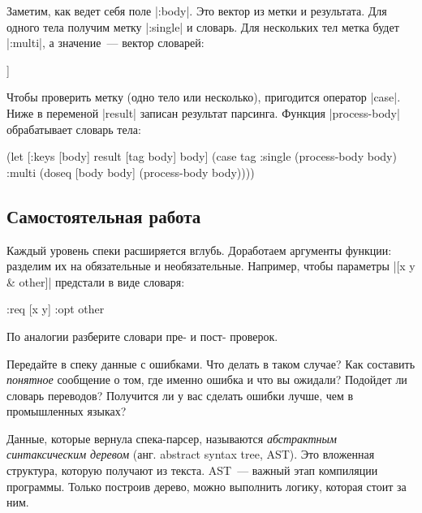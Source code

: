 Заметим, как ведет себя поле \spverb|:body|. Это вектор из метки и
результата. Для одного тела получим метку \spverb|:single| и словарь. Для
нескольких тел метка будет \spverb|:multi|, а значение~--- вектор словарей:

\begin{english}
  \begin{clojure}
[:multi [{:args [x] :code [(println 1)]}
         {:args [x y] :code [(println 2)]}]]
  \end{clojure}
\end{english}

Чтобы проверить метку (одно тело или несколько), пригодится оператор
\spverb|case|. Ниже в переменой \spverb|result| записан результат
парсинга. Функция \spverb|process-body| обрабатывает словарь тела:

\begin{english}
  \begin{clojure}
(let [{:keys [body]} result
      [tag body] body]
  (case tag
    :single
    (process-body body)
    :multi
    (doseq [body body]
      (process-body body))))
  \end{clojure}
\end{english}

\subsection{Самостоятельная работа}

Каждый уровень спеки расширяется вглубь. Доработаем аргументы функции: разделим
их на обязательные и необязательные. Например, чтобы параметры \spverb|[x y & other]|
предстали в виде словаря:

\begin{english}
  \begin{clojure}
{:req [x y] :opt other}
  \end{clojure}
\end{english}

\noindent
По аналогии разберите словари пре- и пост- проверок.

Передайте в спеку данные с ошибками. Что делать в таком случае? Как составить
\emph{понятное} сообщение о том, где именно ошибка и что вы ожидали? Подойдет ли
словарь переводов? Получится ли у вас сделать ошибки лучше, чем в промышленных
языках?

Данные, которые вернула спека-парсер, называются
\emph{абстрактным синтаксическим деревом}
(анг. abstract syntax tree, AST). Это вложенная структура, которую получают из
текста. AST~--- важный этап компиляции программы. Только построив дерево, можно
выполнить логику, которая стоит за ним.

